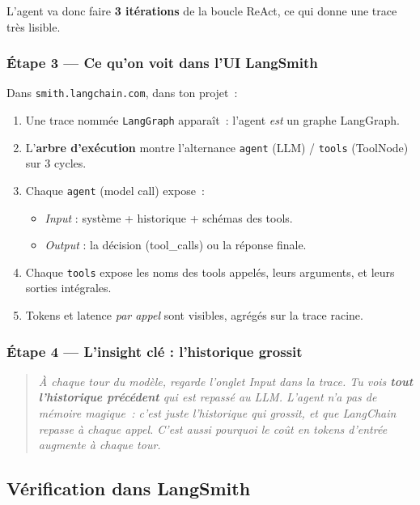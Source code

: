 \documentclass[11pt,a4paper]{article}
\begin{document}
L'agent va donc faire \textbf{3 itérations} de la boucle ReAct, ce qui
donne une trace très lisible.

\subsubsection*{Étape 3 — Ce qu'on voit dans l'UI LangSmith}

Dans \texttt{smith.langchain.com}, dans ton projet~:

\begin{enumerate}[leftmargin=*]
  \item Une trace nommée \texttt{LangGraph} apparaît~: l'agent
        \emph{est} un graphe LangGraph.
  \item L'\textbf{arbre d'exécution} montre l'alternance
        \texttt{agent} (LLM) / \texttt{tools} (ToolNode) sur 3 cycles.
  \item Chaque \texttt{agent} (model call) expose~:
        \begin{itemize}
        \item \emph{Input} : système + historique + schémas des tools.
        \item \emph{Output} : la décision (tool\_calls) ou la réponse
              finale.
        \end{itemize}
  \item Chaque \texttt{tools} expose les noms des tools appelés, leurs
        arguments, et leurs sorties intégrales.
  \item Tokens et latence \emph{par appel} sont visibles, agrégés sur
        la trace racine.
\end{enumerate}

\subsubsection*{Étape 4 — L'insight clé : l'historique grossit}

\begin{quote}\itshape
À chaque tour du modèle, regarde l'onglet \emph{Input} dans la trace.
Tu vois \textbf{tout l'historique précédent} qui est repassé au LLM.
L'agent n'a pas de mémoire magique~: c'est juste l'historique qui
grossit, et que LangChain repasse à chaque appel. C'est aussi pourquoi
le coût en tokens d'entrée augmente à chaque tour.
\end{quote}

\subsection{Vérification dans LangSmith}
\end{document}
